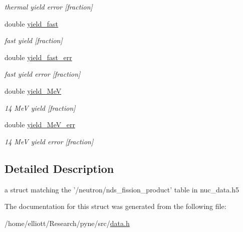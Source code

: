 \begin{DoxyCompactItemize}
\begin{DoxyCompactList}\small\item\em thermal yield error \mbox{[}fraction\mbox{]} \end{DoxyCompactList}\item 
\hypertarget{structpyne_1_1ndsfpy_ae890b10d182d771d0837b24818040a25}{double \hyperlink{structpyne_1_1ndsfpy_ae890b10d182d771d0837b24818040a25}{yield\-\_\-fast}}\label{structpyne_1_1ndsfpy_ae890b10d182d771d0837b24818040a25}

\begin{DoxyCompactList}\small\item\em fast yield \mbox{[}fraction\mbox{]} \end{DoxyCompactList}\item 
\hypertarget{structpyne_1_1ndsfpy_a0e2478bc6cbf2317861727a88cb8370b}{double \hyperlink{structpyne_1_1ndsfpy_a0e2478bc6cbf2317861727a88cb8370b}{yield\-\_\-fast\-\_\-err}}\label{structpyne_1_1ndsfpy_a0e2478bc6cbf2317861727a88cb8370b}

\begin{DoxyCompactList}\small\item\em fast yield error \mbox{[}fraction\mbox{]} \end{DoxyCompactList}\item 
\hypertarget{structpyne_1_1ndsfpy_a5e67e99b97b5ca511ca39c6dcd4b186e}{double \hyperlink{structpyne_1_1ndsfpy_a5e67e99b97b5ca511ca39c6dcd4b186e}{yield\-\_\-Me\-V}}\label{structpyne_1_1ndsfpy_a5e67e99b97b5ca511ca39c6dcd4b186e}

\begin{DoxyCompactList}\small\item\em 14 Me\-V yield \mbox{[}fraction\mbox{]} \end{DoxyCompactList}\item 
\hypertarget{structpyne_1_1ndsfpy_a1d24f4162fe242108b8032f76171d7e5}{double \hyperlink{structpyne_1_1ndsfpy_a1d24f4162fe242108b8032f76171d7e5}{yield\-\_\-Me\-V\-\_\-err}}\label{structpyne_1_1ndsfpy_a1d24f4162fe242108b8032f76171d7e5}

\begin{DoxyCompactList}\small\item\em 14 Me\-V yield error \mbox{[}fraction\mbox{]} \end{DoxyCompactList}\end{DoxyCompactItemize}


\subsection{Detailed Description}
a struct matching the '/neutron/nds\-\_\-fission\-\_\-product' table in nuc\-\_\-data.\-h5 

The documentation for this struct was generated from the following file\-:\begin{DoxyCompactItemize}
\item 
/home/elliott/\-Research/pyne/src/\hyperlink{data_8h}{data.\-h}\end{DoxyCompactItemize}
